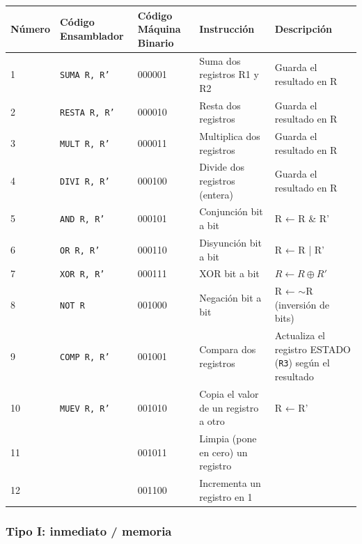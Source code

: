 \documentclass{article}
\begin{document}
\begin{table}[H]
    \centering
    \begin{tabular}{|p{1.3cm}|p{3cm}|p{1.6cm}|p{5cm}|p{4cm}|}
    \hline
    \textbf{Número} & \textbf{Código Ensamblador} & \textbf{Código Máquina Binario} & \textbf{Instrucción} & \textbf{Descripción} \\
    \hline
    1  & \texttt{SUMA R, R'} & 000001 & Suma dos registros R1 y R2 & Guarda el resultado en R \\
    \hline
    2  & \texttt{RESTA R, R'} & 000010 & Resta dos registros & Guarda el resultado en R \\
    \hline
    3  & \texttt{MULT R, R'} & 000011 & Multiplica dos registros & Guarda el resultado en R \\
    \hline
    4  & \texttt{DIVI R, R'} & 000100 & Divide dos registros (entera) & Guarda el resultado en R \\
    \hline
    5  & \texttt{AND R, R'} & 000101 & Conjunción bit a bit & R ← R \& R' \\
    \hline
    6  & \texttt{OR R, R'} & 000110 & Disyunción bit a bit & R ← R | R' \\
    \hline
    7  & \texttt{XOR R, R'} & 000111 & XOR bit a bit & $R \leftarrow R \oplus R'$ \\
    \hline
    8  & \texttt{NOT R} & 001000 & Negación bit a bit & R ← $\sim$R (inversión de bits) \\
    \hline
    9  & \texttt{COMP R, R'} & 001001 & Compara dos registros & Actualiza el registro ESTADO (\texttt{R3}) según el resultado \\
    \hline
    10 & \texttt{MUEV R, R'} & 001010 & Copia el valor de un registro a otro & R ← R' \\
    \hline
    11 & & 001011 & Limpia (pone en cero) un registro & \\
    \hline
    12 & & 001100 & Incrementa un registro en 1 & \\
    \hline
    \end{tabular}
\end{table}

\subsubsection{Tipo I: \textbf{inmediato / memoria}}
\end{document}
